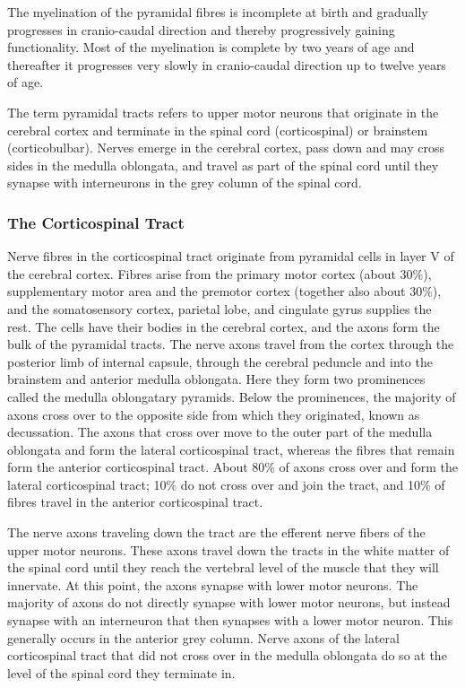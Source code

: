 The myelination of the pyramidal fibres is incomplete at birth and gradually progresses in cranio-caudal direction and thereby progressively gaining functionality. Most of the myelination is complete by two years of age and thereafter it progresses very slowly in cranio-caudal direction up to twelve years of age.

The term pyramidal tracts refers to upper motor neurons that originate in the cerebral cortex and terminate in the spinal cord (corticospinal) or brainstem (corticobulbar). Nerves emerge in the cerebral cortex, pass down and may cross sides in the medulla oblongata, and travel as part of the spinal cord until they synapse with interneurons in the grey column of the spinal cord.

\hypertarget{the-corticospinal-tract}{%
\subsubsection{The Corticospinal Tract}\label{the-corticospinal-tract}}

Nerve fibres in the corticospinal tract originate from pyramidal cells in layer V of the cerebral cortex. Fibres arise from the primary motor cortex (about 30\%), supplementary motor area and the premotor cortex (together also about 30\%), and the somatosensory cortex, parietal lobe, and cingulate gyrus supplies the rest. The cells have their bodies in the cerebral cortex, and the axons form the bulk of the pyramidal tracts. The nerve axons travel from the cortex through the posterior limb of internal capsule, through the cerebral peduncle and into the brainstem and anterior medulla oblongata. Here they form two prominences called the medulla oblongatary pyramids. Below the prominences, the majority of axons cross over to the opposite side from which they originated, known as decussation. The axons that cross over move to the outer part of the medulla oblongata and form the lateral corticospinal tract, whereas the fibres that remain form the anterior corticospinal tract. About 80\% of axons cross over and form the lateral corticospinal tract; 10\% do not cross over and join the tract, and 10\% of fibres travel in the anterior corticospinal tract.

The nerve axons traveling down the tract are the efferent nerve fibers of the upper motor neurons. These axons travel down the tracts in the white matter of the spinal cord until they reach the vertebral level of the muscle that they will innervate. At this point, the axons synapse with lower motor neurons. The majority of axons do not directly synapse with lower motor neurons, but instead synapse with an interneuron that then synapses with a lower motor neuron. This generally occurs in the anterior grey column. Nerve axons of the lateral corticospinal tract that did not cross over in the medulla oblongata do so at the level of the spinal cord they terminate in.

